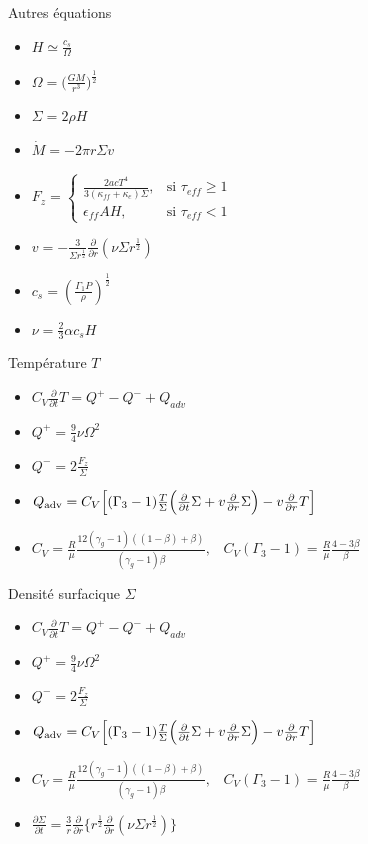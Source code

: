\documentclass{beamer}
\newcommand{\derivt}[1]{\frac{\partial}{\partial t} #1}
\newcommand{\derivr}[1]{\frac{\partial}{\partial r} #1}
\begin{document}
\begin{frame}{Autres équations}
    \begin{itemize}
        \item $H \simeq \frac{c_s}{\Omega}$
        \item $\Omega = \Big( \frac{GM}{r^3}\Big) ^{\frac{1}{2}}$
        \item $\Sigma = 2\rho H$
        \item $\dot M = - 2 \pi r \Sigma v$
        \item $F_z=\begin{cases} \frac{2acT^4}{3(\kappa_{ff}+\kappa_e)\Sigma}, & \mbox{si } \tau_{eff} \geq 1\\ \epsilon_{ff}AH, & \mbox{si } \tau_{eff} < 1  \end{cases}$
        \item $ v = -\frac{3}{\Sigma r^{\frac{1}{2}}}\derivr{(\nu \Sigma r^{\frac{1}{2}})}$
        \item $c_s = \left ( \frac{\Gamma_1 P}{\rho} \right )^{\frac{1}{2}}$
        \item $\nu = \frac{2}{3}\alpha c_s H$
    \end{itemize}
\end{frame}

\begin{frame}{Température $T$}
    \begin{itemize}
        \item $  C_V \derivt{T}=Q^+ - Q^- +Q_{adv}$
        \item $Q^+ = \frac{9}{4}\nu \Omega ^2$
        \item $Q^-= 2\frac{F_z}{\Sigma}$
        \item $Q_{\rm{adv}} = C_V\Big[ (\Gamma_3 - 1) \frac{T}{\Sigma}\Big( \derivt{\Sigma}+v\derivr{\Sigma} \Big) -v\derivr{T} \Big]$
        \item  $C_V = \frac{R}{\mu}\frac{12(\gamma_g -1)((1-\beta)+\beta)}{(\gamma_g - 1)\beta} \text{,} \quad C_V(\Gamma_3 -1) = \frac{R}{\mu}\frac{4-3\beta}{\beta}$
    \end{itemize}
\end{frame}

\begin{frame}{Densité surfacique $\Sigma$}
    \begin{itemize}
        \item $  C_V \derivt{T}=Q^+ - Q^- +Q_{adv}$
        \item $Q^+ = \frac{9}{4}\nu \Omega ^2$
        \item $Q^-= 2\frac{F_z}{\Sigma}$
        \item $Q_{\rm{adv}} = C_V\Big[ (\Gamma_3 - 1) \frac{T}{\Sigma}\Big( \derivt{\Sigma}+v\derivr{\Sigma} \Big) -v\derivr{T} \Big]$
        \item  $C_V = \frac{R}{\mu}\frac{12(\gamma_g -1)((1-\beta)+\beta)}{(\gamma_g - 1)\beta} \text{,} \quad C_V(\Gamma_3 -1) = \frac{R}{\mu}\frac{4-3\beta}{\beta}$
        
        \item $\frac{\partial {\Sigma}}{\partial t} = \frac{3}{r}\derivr{ \big \{ r^{\frac{1}{2}} \derivr{(\nu \Sigma r^{\frac{1}{2}})} \big \}}$
    \end{itemize}
\end{frame}
\end{document}
